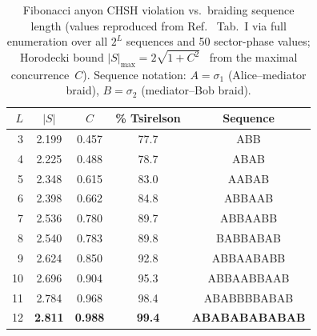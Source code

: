 \documentclass[aps,pra,twocolumn,superscriptaddress,showpacs,floatfix]{revtex4-2}
\begin{document}
\begin{table}[b]
\caption{Fibonacci anyon CHSH violation vs.\ braiding sequence length
(values reproduced from Ref.~\cite{Sayim2026fibonacci} Tab.~I via full enumeration
over all $2^L$ sequences and 50 sector-phase values; Horodecki bound
$|S|_{\max} = 2\sqrt{1+C^2}$~\cite{Horodecki1995} from the maximal
concurrence~$C$).  Sequence notation: $A = \sigma_1$ (Alice--mediator braid),
$B = \sigma_2$ (mediator--Bob braid).}
\label{tab:fibonacci}
\begin{ruledtabular}
\begin{tabular}{rcccc}
$L$ & $|S|$ & $C$ & \% Tsirelson & Sequence \\
\hline
 3 & 2.199 & 0.457 & 77.7 & ABB \\
 4 & 2.225 & 0.488 & 78.7 & ABAB \\
 5 & 2.348 & 0.615 & 83.0 & AABAB \\
 6 & 2.398 & 0.662 & 84.8 & ABBAAB \\
 7 & 2.536 & 0.780 & 89.7 & ABBAABB \\
 8 & 2.540 & 0.783 & 89.8 & BABBABAB \\
 9 & 2.624 & 0.850 & 92.8 & ABBAABABB \\
10 & 2.696 & 0.904 & 95.3 & ABBAABBAAB \\
11 & 2.784 & 0.968 & 98.4 & ABABBBBABAB \\
12 & \textbf{2.811} & \textbf{0.988} & \textbf{99.4} & \textbf{ABABABABABAB} \\
\end{tabular}
\end{ruledtabular}
\end{table}
\end{document}
